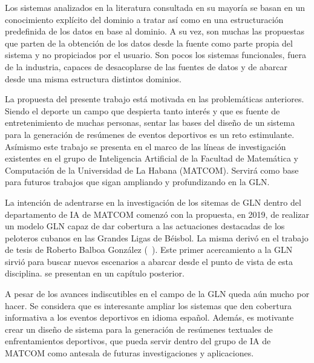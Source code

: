     Los sistemas analizados en la literatura consultada en su mayoría se basan en un conocimiento explícito del dominio a tratar así como en una 
estructuración predefinida de los datos en base al dominio. A su vez, son muchas las propuestas que parten de la obtención de los datos desde 
la fuente como parte propia del sistema y no propiciados por el usuario. Son pocos los sistemas funcionales, fuera de la industria, capaces de 
desacoplarse de las fuentes de datos y de abarcar desde una misma estructura distintos dominios.



    La propuesta del presente trabajo está motivada en las problemáticas anteriores. Siendo el deporte un campo que despierta tanto 
interés y que es fuente de entretenimiento de muchas personas, sentar las bases del diseño de un sistema para la generación de resúmenes de 
eventos deportivos es un reto estimulante. Asímismo este trabajo se presenta en el marco de las líneas de investigación existentes en el 
grupo de Inteligencia Artificial de la Facultad de Matemática y Computación de la Universidad de La Habana (MATCOM). Servirá como base 
para futuros trabajos que sigan ampliando y profundizando en la GLN.

    La intención de adentrarse en la investigación de los sitemas de GLN dentro del departamento de IA de MATCOM comenzó con la propuesta, en 2019, 
de realizar un modelo GLN capaz de dar cobertura a las actuaciones destacadas de los peloteros cubanos en las Grandes Ligas de Béisbol. La misma derivó 
en el trabajo de tesis de Roberto Balboa González (~\cite{balboa2020}). Este primer acercamiento a la GLN sirvió para buscar nuevos escenarios a abarcar 
desde el punto de vista de esta disciplina. %
se presentan en un capítulo posterior.%

A pesar de los avances indiscutibles en el campo de la GLN queda aún mucho por hacer. Se considera que es interesante ampliar los sistemas que den cobertura informativa a los eventos 
deportivos en idioma español. Además, es motivante crear un diseño de sistema para la generación de resúmenes textuales de enfrentamientos deportivos, que pueda servir dentro del grupo de IA de MATCOM como antesala de futuras investigaciones y aplicaciones.


